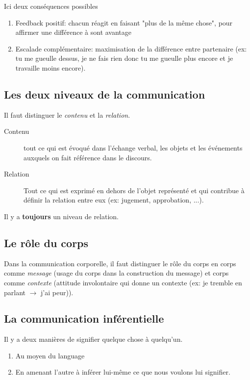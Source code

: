 \documentclass[11pt]{article} %
\begin{document}
	Ici deux conséquences possibles
	\begin{enumerate}
		\item Feedback positif: chacun réagit en faisant "plus de la même chose", pour affirmer une différence à sont avantage
		\item Escalade complémentaire: maximisation de la différence entre partenaire (ex: tu me gueulle dessus, je ne fais rien donc tu me gueulle plus encore et je travaille moins encore).
	\end{enumerate}

	\subsection{Les deux niveaux de la communication}

	Il faut distinguer le \textit{contenu} et la \textit{relation}. 

	\begin{description}
		\item[Contenu] tout ce qui est évoqué dans l'échange verbal, les objets et les événements auxquels on fait référence dans le discours.
		\item[Relation] Tout ce qui est exprimé en dehors de l'objet représenté et qui contribue à définir la relation entre eux (ex: jugement, approbation, ...).
	\end{description}

	Il y a \textbf{toujours} un niveau de relation.

	\subsection{Le rôle du corps}

	Dans la communication corporelle, il faut distinguer le rôle du corps en corps comme \textit{message} (usage du corps dans la construction du message) et corps comme \textit{contexte} (attitude involontaire qui donne un contexte (ex: je tremble en parlant $\rightarrow$ j'ai peur)).


	\subsection{La communication inférentielle}

	Il y a deux manières de signifier quelque chose à quelqu'un.
	\begin{enumerate}
		\item Au moyen du language
		\item En amenant l'autre à inférer lui-même ce que nous voulons lui signifier.
	\end{enumerate}
\end{document}
